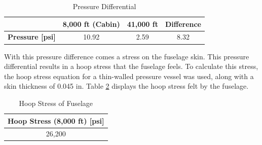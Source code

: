 \begin{table}[!h]
    \centering
    \caption{Pressure Differential}
    \begin{tabular}{|c|c|c|c|}\toprule 
     & \textbf{8,000 ft (Cabin)} & \textbf{41,000 ft} & \textbf{Difference} \\ \hline \hline
    \textbf{Pressure [psi]} & 10.92 & 2.59 & 8.32 \\ 
    \bottomrule
    \end{tabular}
    \label{tab:pres}
\end{table}

With this pressure difference comes a stress on the fuselage skin. This pressure differential results in a hoop stress that the fuselage feels. To calculate this stress, the hoop stress equation for a thin-walled pressure vessel was used, along with a skin thickness of 0.045 in. Table \ref{hoopstrs} displays the hoop stress felt by the fuselage.

\begin{table}[!h]
    \centering
    \caption{Hoop Stress of Fuselage}
    \begin{tabular}{|c|}\toprule 
    \textbf{Hoop Stress (8,000 ft) [psi]} \\ \hline
    26,200 \\ 
    \bottomrule
    \end{tabular}
    \label{hoopstrs}
\end{table}


